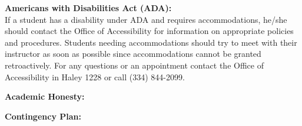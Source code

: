 \documentclass[10pt]{article}
\begin{document}
{\bf Americans with Disabilities Act (ADA):}\\
If a student has a disability under ADA and requires accommodations, he/she should contact the Office of Accessibility for information on appropriate policies and procedures.  Students needing accommodations should try to meet with their instructor as soon as possible since accommodations cannot be granted retroactively.  For any questions or an appointment contact the Office of Accessibility in Haley 1228 or call (334) 844-2099.

\newpage

{\bf Academic Honesty:} \\
\AcaHon

{\bf Contingency Plan:} \\
\ContPlan


\end{document}
